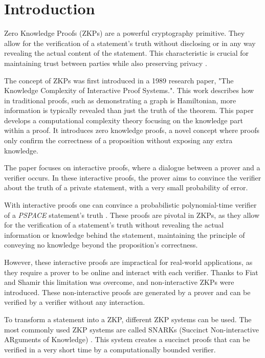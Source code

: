 \chapter{Introduction}

Zero Knowledge Proofs (ZKPs) are a powerful cryptography primitive. They allow
for the verification of a statement's truth without disclosing or in any way revealing
the actual content of the statement. This characteristic is crucial for
maintaining trust between parties while also preserving privacy \cite{goldreich1991proofs}.

The concept of ZKPs was first introduced in a 1989 research paper, "The
Knowledge Complexity of Interactive Proof Systems."\cite{Goldwasser1989}.
This work describes how in traditional proofs, such as demonstrating a graph
is Hamiltonian, more information is typically revealed than just the truth of
the theorem. This paper develops a computational complexity theory focusing
on the knowledge part within a proof. It introduces zero knowledge proofs,
a novel concept where proofs only confirm the correctness of a proposition
without exposing any extra knowledge.

The paper focuses on interactive proofs, where a dialogue between a prover and
a verifier occurs. In these interactive proofs, the prover aims to convince
the verifier about the truth of a private statement, with a very small
probability of error.

With interactive proofs one can convince a probabilistic polynomial-time verifier
of a \emph{PSPACE} statement's truth \cite{Shamir1992, Lund1992}. These proofs
are pivotal in ZKPs, as they allow for the verification of a statement's truth
without revealing the actual information or knowledge behind the statement,
maintaining the principle of conveying no knowledge beyond the proposition's
correctness.

However, these interactive proofs are impractical for real-world applications, as they
require a prover to be online and interact with each verifier. Thanks to Fiat
and Shamir \cite{Fiat} this limitation was overcome, and non-interactive
ZKPs were introduced. These non-interactive proofs are
generated by a prover and can be verified by a verifier without any
interaction.

To transform a statement into a ZKP, different ZKP systems can be used. The most
commonly used ZKP systems are called SNARKs (Succinct Non-interactive ARguments
of Knowledge) \cite{Groth16}. This system creates a succinct proofs that can be
verified in a very short time by a computationally bounded verifier.

